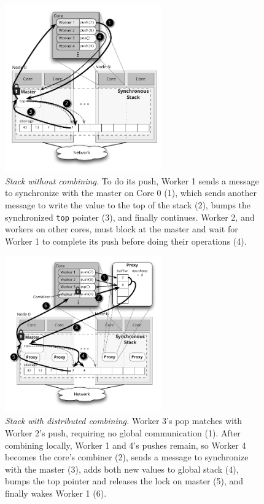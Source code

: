 \begin{figure}[t]
    \centering
    \includegraphics[width=0.6\textwidth]{figs/stack_nofc.pdf}
    \caption{\emph{Stack without combining.}
      To do its push, Worker 1 sends a message to synchronize with the master on Core 0 (1), which sends another message to write the value to the top of the stack (2), bumps the synchronized \texttt{top} pointer (3), and finally continues. Worker 2, and workers on other cores, must block at the master and wait for Worker 1 to complete its push before doing their operations (4).
    }
    \label{fig:stacknofc}
\end{figure}
\begin{figure}
    \centering
    \includegraphics[width=0.6\textwidth]{figs/stack_fc.pdf}
    \caption{\emph{Stack with distributed combining.}
      Worker 3's pop matches with Worker 2's push, requiring no global communication (1). After combining locally, Worker 1 and 4's pushes remain, so Worker 4 becomes the core's combiner (2), sends a message to synchronize with the master (3), adds both new values to global stack (4), bumps the top pointer and releases the lock on master (5), and finally wakes Worker 1 (6).
    }
    \label{fig:stackfc}
\end{figure}
